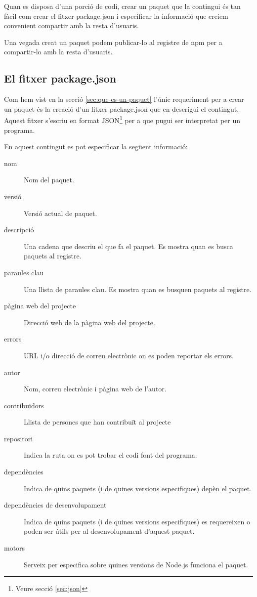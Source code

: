 Quan es disposa d'una porció de codi, crear un paquet que la contingui és tan fàcil com crear el fitxer package.json i especificar la informació que creiem convenient compartir amb la resta d'usuaris. 

Una vegada creat un paquet podem publicar-lo al registre de npm per a compartir-lo amb la resta d'usuaris. 

\subsection{El fitxer package.json}
\label{sec:fitxer-package.json}

Com hem vist en la secció \ref{sec:que-es-un-paquet} l'únic requeriment per a crear un paquet és la creació d'un fitxer package.json que en descrigui el contingut. Aquest fitxer s'escriu en format JSON\footnote{Veure secció \ref{sec:json}} per a que pugui ser interpretat per un programa.

En aquest contingut es pot especificar la següent informació: 
\begin{description}
\item[nom] {Nom del paquet.}
\item[versió] {Versió actual de paquet.}
\item[descripció] {Una cadena que descriu el que fa el paquet. Es mostra quan es busca paquets al registre.}
\item[paraules clau] {Una llista de paraules clau. Es mostra quan es busquen paquets al registre.}
\item[pàgina web del projecte] {Direcció web de la pàgina web del projecte.}
\item[errors] { URL i/o direcció de correu electrònic on es poden reportar els errors. }
\item[autor] {Nom, correu electrònic i pàgina web de l'autor.}
\item[contribuïdors] { Llista de persones que han contribuït al projecte}
\item[repositori] { Indica la ruta on es pot trobar el codi font del programa. }
\item[dependències] { Indica de quins paquets (i de quines versions especifiques) depèn el paquet.}
\item[dependències de desenvolupament] { Indica de quins paquets (i de quines versions especifiques) es requereixen o poden ser útils per al desenvolupament d'aquest paquet.}
\item[motors] {Serveix per especifica sobre quines versions de Node.js funciona el paquet.}
\end{description}

